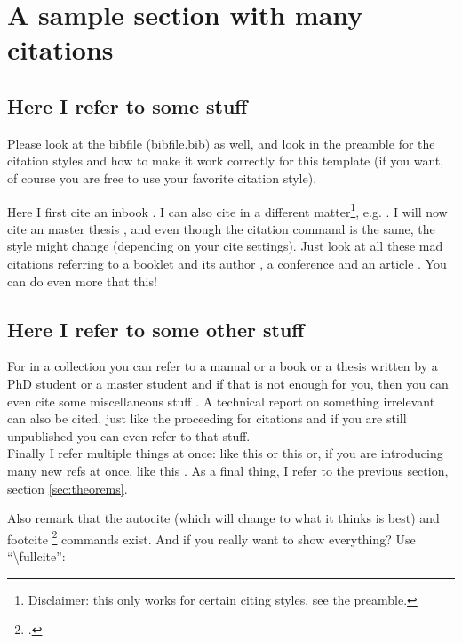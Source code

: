 \documentclass[thesis]{subfiles}
\begin{document}
\section{A sample section with many citations}

\subsection{Here I refer to some stuff}
Please look at the bibfile (bibfile.bib) as well, and look in the preamble for the citation styles and how to make it work correctly for this template (if you want, of course you are free to use your favorite citation style).

Here I first cite an inbook \cite{inbook}. I can also cite in a different matter\footnote{Disclaimer: this only works for certain citing styles, see the preamble.}, e.g. \textcite{inbook}. I will now cite an master thesis \cite{mastersthesis}, and even though the citation command is the same, the style might change (depending on your cite settings). Just look at all these mad citations referring to a booklet \cite{booklet} and its author \parencite{booklet}, a conference \cite{conference} and an article \cite{article}. You can do even more that this! 

\subsection{Here I refer to some other stuff}
For in a collection \cite{incollection} you can refer to a manual \cite{manual} or a book \cite{book} or a thesis written by a PhD student \cite{phdthesis} or a master student \cite{mastersthesis} and if that is not enough for you, then you can even cite some miscellaneous stuff \cite{misc}. A technical report on something irrelevant \cite{techreport} can also be cited, just like the proceeding for citations \cite{proceedings} and if you are still unpublished \cite{unpublished} you can even refer to that stuff.\\
Finally I refer multiple things at once: like this \cite{misc,phdthesis} or this \cite{incollection,conference,techreport} or, if you are introducing many new refs at once, like this \cite{inbook,mastersthesis,booklet,conference} . As a final thing, I refer to the previous section, section \ref{sec:theorems}.

Also remark that the autocite (which will change to what it thinks is best) \autocite{reference} and footcite \footcite{reference} commands exist.
\bigbreak
And if you really want to show everything? Use  ``\textbackslash fullcite'':\newline  {}
\end{document}
